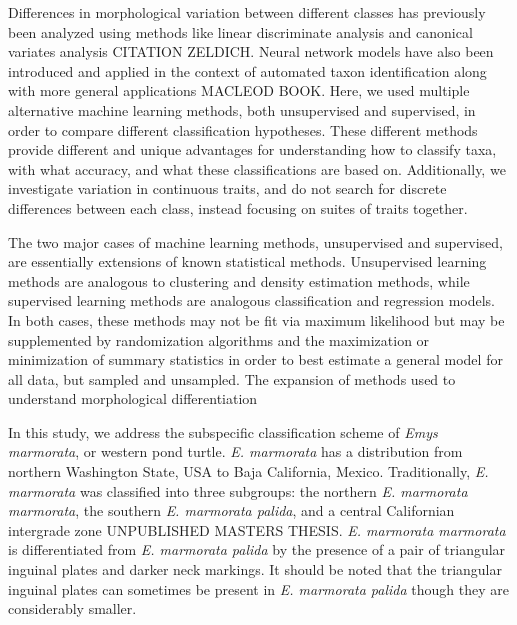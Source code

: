 \documentclass[12pt,letterpaper]{article}\usepackage{graphicx, color}
\begin{document}
Differences in morphological variation between different classes has previously been analyzed using methods like linear discriminate analysis and canonical variates analysis CITATION ZELDICH. Neural network models have also been introduced and applied in the context of automated taxon identification along with more general applications MACLEOD BOOK. Here, we used multiple alternative machine learning methods, both unsupervised and supervised, in order to compare different classification hypotheses. These different methods provide different and unique advantages for understanding how to classify taxa, with what accuracy, and what these classifications are based on. Additionally, we investigate variation in continuous traits, and do not search for discrete differences between each class, instead focusing on suites of traits together.

The two major cases of machine learning methods, unsupervised and supervised, are essentially extensions of known statistical methods. Unsupervised learning methods are analogous to clustering and density estimation methods, while supervised learning methods are analogous classification and regression models. In both cases, these methods may not be fit via maximum likelihood but may be supplemented by randomization algorithms and the maximization or minimization of summary statistics in order to best estimate a general model for all data, but sampled and unsampled. The expansion of methods used to understand morphological differentiation 


In this study, we address the subspecific classification scheme of \textit{Emys marmorata}, or western pond turtle. \textit{E. marmorata} has a distribution from northern Washington State, USA to Baja California, Mexico.
Traditionally, \textit{E. marmorata} was classified into three subgroups: the northern \textit{E. marmorata marmorata}, the southern \textit{E. marmorata palida}, and a central Californian intergrade zone \citep{Seeliger1945} UNPUBLISHED MASTERS THESIS. \textit{E. marmorata marmorata} is differentiated from \textit{E. marmorata palida} by the presence of a pair of triangular inguinal plates and darker neck markings. It should be noted that the triangular inguinal plates can sometimes be present in \textit{E. marmorata palida} though they are considerably smaller.
\end{document}
